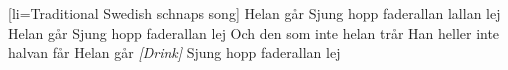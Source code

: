 [li={Traditional Swedish schnaps song}]
\beginverse
Helan går
Sjung hopp faderallan lallan lej
Helan går
Sjung hopp faderallan lej
Och den som inte helan trår
Han heller inte halvan får
Helan går
\emph{[Drink]}
Sjung hopp faderallan lej
\endverse
\endsong
